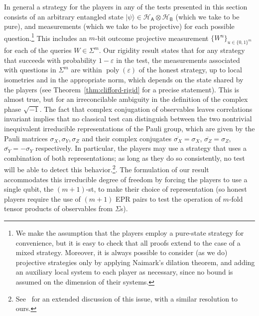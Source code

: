 \documentclass[11pt]{article}
\newcommand{\ket}[1]{|#1\rangle}
\DeclareMathOperator{\poly}{poly}
\newcommand{\reg}[1]{{\textsf{#1}}}
\newcommand{\mH}{\mathcal{H}}
\newcommand{\eps}{\varepsilon}
\begin{document}
In general a strategy for the players in any of the tests presented in this section consists of an arbitrary entangled state $\ket{\psi} \in \mH_\reg{A} \otimes \mH_\reg{B}$ (which we take to be pure), and measurements (which we take to be projective) for each possible question.\footnote{We make the assumption that the players employ a pure-state strategy for convenience, but it is easy to check that all proofs extend to the case of a mixed strategy. Moreover, it is always possible to consider (as we do)  projective strategies only by applying Naimark's dilation theorem, and adding an auxiliary local system to each player as necessary, since no bound is assumed on the dimension of their systems.} This includes an $m$-bit outcome projective measurement $\{W^u\}_{u\in\{0,1\}^{m}}$ for each of the queries $W\in\Sigma^m$. Our rigidity result states that for any strategy that succeeds with probability $1-\eps$ in the test, the measurements associated with questions in $\Sigma^m$ are within $\poly(\eps)$ of the honest strategy, up to local isometries and in the appropriate norm, which depends on the state shared by the players (see Theorem~\ref{thm:clifford-rigid} for a precise statement). This is almost true, but for an irreconcilable ambiguity in the definition of the complex phase $\sqrt{-1}$. The fact that complex conjugation of observables 
leaves correlations invariant implies that no classical test can distinguish between the two nontrivial inequivalent irreducible representations of the Pauli group, which are given by the Pauli matrices $\sigma_X,\sigma_Y,\sigma_Z$ and their complex conjugates $\overline{\sigma_X}=\sigma_X$, $\overline{\sigma_Z}=\sigma_Z$, $\overline{\sigma_Y}=-\sigma_Y$ respectively. In particular, the players may use a strategy that uses a combination of both representations; as long as they do so consistently, no test will be able to detect this behavior.\footnote{See~\cite[Appendix A]{reichardt2012classicalarxiv} for an extended discussion of this issue, with a similar resolution to ours.}.  The formulation of our result accommodates this irreducible degree of freedom by forcing the players to use a single qubit, the $(m+1)$-st, to make their choice of representation (so honest players require the use of $(m+1)$ EPR pairs to test the operation of $m$-fold tensor products of observables from $\Sigma$s). 
\end{document}
